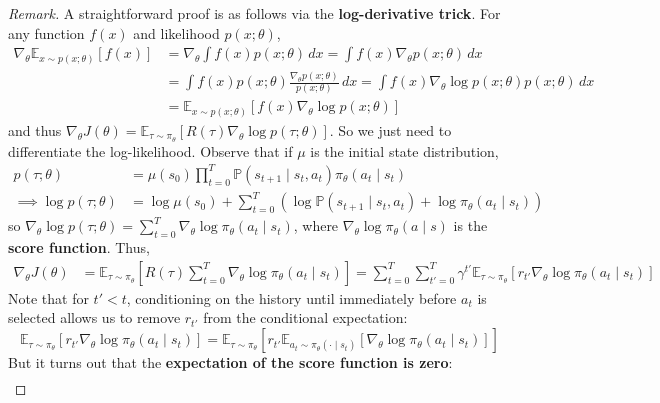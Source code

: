 \documentclass[11pt, letterpaper]{article}
\newenvironment{remark}
    {\renewcommand\qedsymbol{\(\blacksquare\)}\begin{proof}[Remark]}
    {\end{proof}}
\begin{document}
\begin{remark}
    A straightforward proof is as follows via the \textbf{log-derivative trick}. For any function \(f(x)\) and likelihood \(p(x; \theta)\), 
    \begin{align*}
        \nabla_{\theta} \mathbb{E}_{x \sim p(x; \theta)} [f(x)] &= \nabla_{\theta} \int f(x) p(x; \theta) \, dx 
        = \int f(x) \nabla_{\theta} p(x; \theta) \, dx \\
        &= \int f(x) p(x; \theta) \frac{\nabla_{\theta} p(x; \theta)}{p(x; \theta)} \, dx 
        = \int f(x) \nabla_{\theta} \log p(x; \theta) p(x; \theta) \, dx \\
        &= \mathbb{E}_{x \sim p(x; \theta)} [f(x) \nabla_{\theta} \log p(x; \theta)]
    \end{align*}
    and thus \(\nabla_\theta J(\theta) = \mathbb{E}_{\tau \sim \pi_\theta}[R(\tau)\nabla_\theta \log p(\tau; \theta)]\). So we just need to differentiate the log-likelihood. Observe that if \(\mu\) is the initial state distribution, 
    \begin{align*}
        p(\tau; \theta) &= \mu(s_0) \prod_{t=0}^T \mathbb{P}(s_{t+1} \mid s_t, a_t) \pi_\theta(a_t \mid s_t) \\
        \implies \log p(\tau; \theta) &= \log\mu(s_0) + \sum_{t=0}^T (\log\mathbb{P}(s_{t+1} \mid s_t, a_t) + \log \pi_{\theta}(a_t \mid s_t))
    \end{align*}
    so \(\nabla_\theta \log p(\tau; \theta) = \sum_{t=0}^T \nabla_\theta \log \pi_\theta(a_t \mid s_t)\), where \(\nabla_\theta \log \pi_\theta(a \mid s)\) is the \textbf{score function}. Thus, 
    \begin{align*}
        \nabla_\theta J(\theta)
        &= \mathbb{E}_{\tau \sim \pi_\theta} \left[ R(\tau) \sum_{t=0}^T \nabla_\theta \log \pi_\theta (a_t \mid s_t) \right]
        = \sum_{t=0}^T \sum_{t'=0}^T \gamma^{t'} \mathbb{E}_{\tau \sim \pi_\theta}[r_{t'} \nabla_\theta \log \pi_\theta(a_t \mid s_t)]
    \end{align*}
    Note that for \(t' < t\), conditioning on the history until immediately before \(a_t\) is selected allows us to remove \(r_{t'}\) from the conditional expectation: 
    \[
        \mathbb{E}_{\tau \sim \pi_\theta} [r_{t'} \nabla_\theta \log \pi_\theta(a_t \mid s_t)]
        = \mathbb{E}_{\tau \sim \pi_\theta} [r_{t'} \mathbb{E}_{a_t \sim \pi_\theta(\cdot \mid s_t)}[\nabla_\theta \log \pi_\theta(a_t \mid s_t)]]
    \]
    But it turns out that the \textbf{expectation of the score function is zero}:
    \begin{align*}

\end{align*}
\end{remark}
\end{document}
